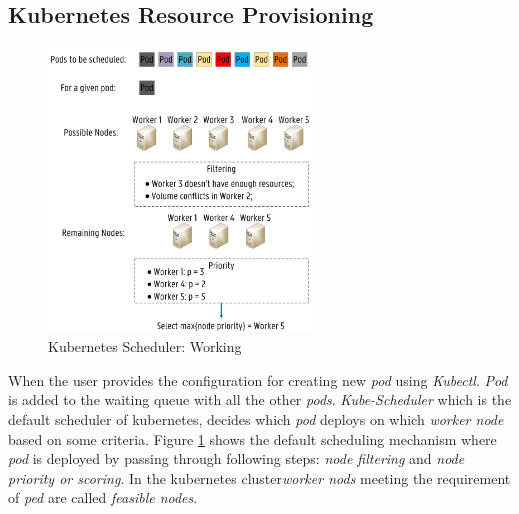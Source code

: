 \subsection{Kubernetes Resource Provisioning}
\label{sec:k8s_scheduler}
\begin{figure}
  \includegraphics[width=70mm]{figures/mlcn-k8s-scheduler.pdf}
  \caption{Kubernetes Scheduler: Working\cite{Santos2019}}
  \label{fig:k8s-sch}
\end{figure}
When the user provides the configuration for creating new \emph{pod} using \emph{Kubectl}. \emph{Pod} is added to the waiting queue with all the other \emph{pods}. \emph{Kube-Scheduler} which is the default scheduler of kubernetes, decides which \emph{pod} deploys on which \emph{worker node} based on some criteria. Figure \ref{fig:k8s-sch} shows the default scheduling mechanism where \emph{pod} is deployed by passing through following steps: \emph{node filtering} and \emph{node priority or scoring}\cite{Santos2019}. In the kubernetes cluster\emph{worker nods} meeting the requirement of \emph{ped} are called \emph{feasible nodes}\cite{k8s}.
